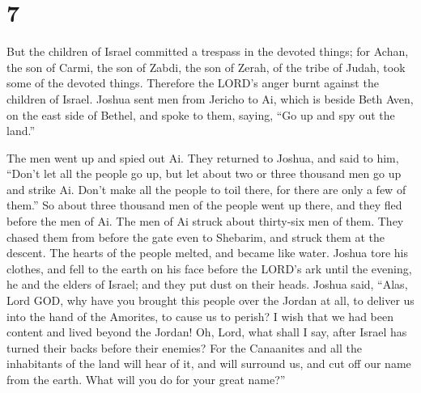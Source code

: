 \hypertarget{section-6}{%
\section{7}\label{section-6}}

 But the children of Israel committed a trespass in the
devoted things; for Achan, the son of Carmi, the son of Zabdi, the son
of Zerah, of the tribe of Judah, took some of the devoted things.
Therefore the LORD's anger burnt against the children of Israel.
 Joshua sent men from Jericho to Ai, which is beside Beth
Aven, on the east side of Bethel, and spoke to them, saying, ``Go up and
spy out the land.''

The men went up and spied out Ai.  They returned to
Joshua, and said to him, ``Don't let all the people go up, but let about
two or three thousand men go up and strike Ai. Don't make all the people
to toil there, for there are only a few of them.''  So
about three thousand men of the people went up there, and they fled
before the men of Ai.  The men of Ai struck about
thirty-six men of them. They chased them from before the gate even to
Shebarim, and struck them at the descent. The hearts of the people
melted, and became like water.  Joshua tore his clothes,
and fell to the earth on his face before the LORD's ark until the
evening, he and the elders of Israel; and they put dust on their heads.
 Joshua said, ``Alas, Lord GOD, why have you brought this
people over the Jordan at all, to deliver us into the hand of the
Amorites, to cause us to perish? I wish that we had been content and
lived beyond the Jordan!  Oh, Lord, what shall I say,
after Israel has turned their backs before their enemies? 
For the Canaanites and all the inhabitants of the land will hear of it,
and will surround us, and cut off our name from the earth. What will you
do for your great name?''

